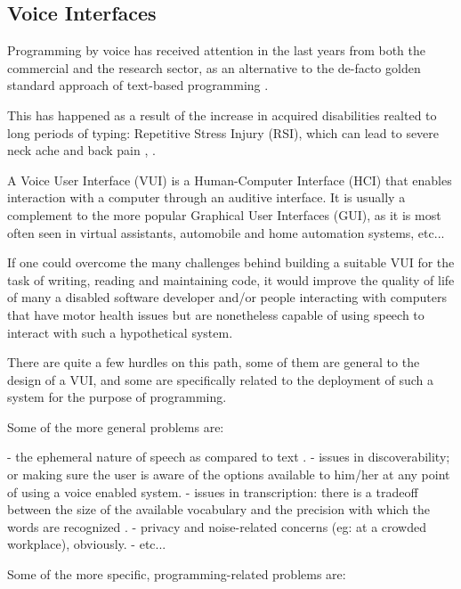 \maketitle
\subsection{Voice Interfaces}

Programming by voice has received attention in the last years from both the commercial and the research sector, as an alternative to the de-facto golden standard approach of text-based programming \cite{lagergren2021programming, arnold2000programming}.

This has happened as a result of the increase in acquired disabilities realted to long periods of typing: Repetitive Stress Injury (RSI), which can lead to severe neck ache and back pain \cite{lagergren2021programming}, \cite{arnold2000programming}.

A Voice User Interface (VUI) is a Human-Computer Interface (HCI) that enables interaction with a computer through an auditive interface. It is usually a complement to the more popular Graphical User Interfaces (GUI), as it is most often seen in virtual assistants, automobile and home automation systems, etc...

If one could overcome the many challenges behind building a suitable VUI for the task of writing, reading and maintaining code, it would improve the quality of life of many a disabled software developer and/or people interacting with computers that have motor health issues but are nonetheless capable of using speech to interact with such a hypothetical system.

There are quite a few hurdles on this path, some of them are general to the design of a VUI, and some are specifically related to the deployment of such a system for the purpose of programming.

Some of the more general problems are:


- the ephemeral nature of speech as compared to text \cite{farinazzo2010empirical}.
- issues in discoverability; or making sure the user is aware of the options available to him/her at any point of using a voice enabled system.
- issues in transcription: there is a tradeoff between the size of the available vocabulary and the precision with which the words are recognized \cite{farinazzo2010empirical}.
- privacy and noise-related concerns (eg: at a crowded workplace), obviously.
- etc...

Some of the more specific, programming-related problems are:

